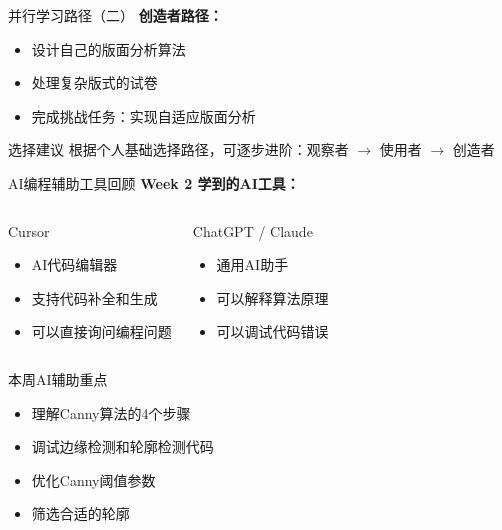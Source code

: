 \begin{frame}{并行学习路径（二）}
    \textbf{创造者路径：}
    \begin{itemize}
        \item 设计自己的版面分析算法
        \item 处理复杂版式的试卷
        \item 完成挑战任务：实现自适应版面分析
    \end{itemize}

    \vspace{0.5cm}

    \begin{alertblock}{选择建议}
        根据个人基础选择路径，可逐步进阶：观察者 $\rightarrow$ 使用者 $\rightarrow$ 创造者
    \end{alertblock}
\end{frame}

\begin{frame}{AI编程辅助工具回顾}
    \textbf{Week 2 学到的AI工具：}
    \begin{columns}
        \begin{block}{Cursor}
            \begin{itemize}\itemsep=0pt
                \item AI代码编辑器
                \item 支持代码补全和生成
                \item 可以直接询问编程问题
            \end{itemize}
        \end{block}
        \begin{block}{ChatGPT / Claude}
            \begin{itemize}\itemsep=0pt
                \item 通用AI助手
                \item 可以解释算法原理
                \item 可以调试代码错误
            \end{itemize}
        \end{block}
    \end{columns}

    \vspace{0.2cm}

    \begin{exampleblock}{本周AI辅助重点}
        \begin{itemize}\itemsep=0pt
            \item 理解Canny算法的4个步骤
            \item 调试边缘检测和轮廓检测代码
            \item 优化Canny阈值参数
            \item 筛选合适的轮廓
        \end{itemize}
    \end{exampleblock}
\end{frame}

